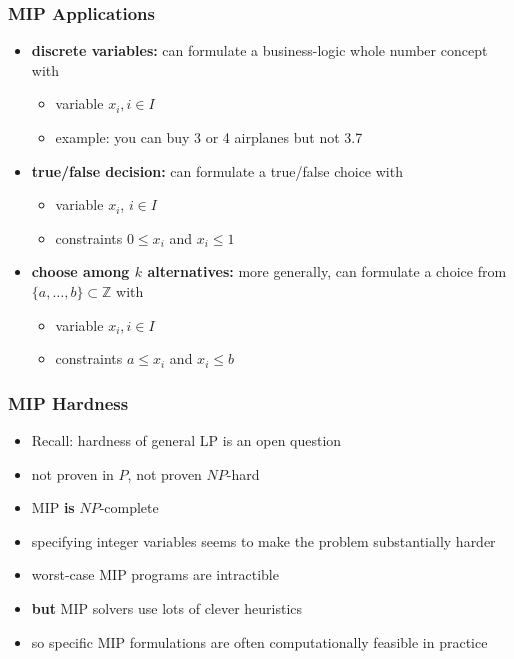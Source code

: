 \documentclass{beamer}
\begin{document}
\begin{frame} \frametitle{MIP Applications}
  \begin{itemize}
  \item \textbf{discrete variables:} can formulate a business-logic whole number concept with
  \begin{itemize}
    \item variable $x_i, i \in I$
    \item example: you can buy 3 or 4 airplanes but not 3.7
  \end{itemize}
  \item \textbf{true/false decision:} can formulate a true/false choice with
    \begin{itemize}
    \item variable $x_i$, $i \in I$
    \item constraints $0 \leq x_i$ and $x_i \leq 1$
    \end{itemize}
\item \textbf{choose among $k$ alternatives:} more generally, can
  formulate a choice from $\{a, \ldots, b\} \subset \mathbb{Z}$ with
  \begin{itemize}
  \item variable $x_i, i \in I$
  \item constraints $a \leq x_i$ and $x_i \leq b$
    \end{itemize}
  \end{itemize}
\end{frame}

\begin{frame} \frametitle{MIP Hardness}
  \begin{itemize}
  \item Recall: hardness of general LP is an open question
  \item not proven in $P$, not proven $NP$-hard
  \item MIP \textbf{is} $NP$-complete
  \item specifying integer variables seems to make the problem substantially harder
  \item worst-case MIP programs are intractible
  \item \textbf{but} MIP solvers use lots of clever heuristics
  \item so specific MIP formulations are often computationally feasible in practice
  \end{itemize}
\end{frame}
\end{document}
